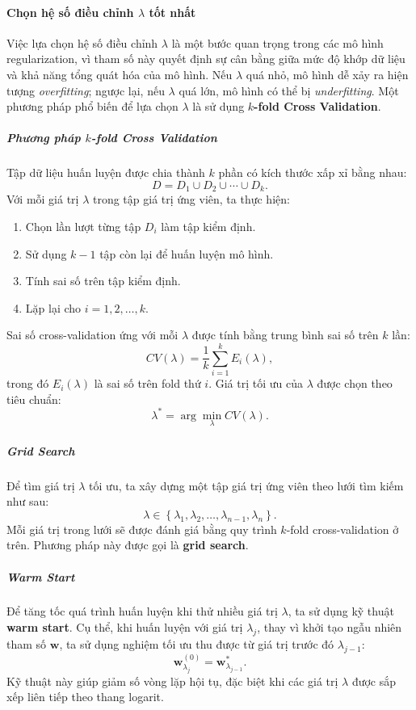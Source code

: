 \paragraph{Chọn hệ số điều chỉnh $\lambda$ tốt nhất}
Việc lựa chọn hệ số điều chỉnh $\lambda$ là một bước quan trọng trong các mô
hình regularization, vì tham số này quyết định sự cân bằng giữa mức độ khớp dữ
liệu và khả năng tổng quát hóa của mô hình. Nếu $\lambda$ quá nhỏ, mô hình dễ
xảy ra hiện tượng \textit{overfitting}; ngược lại, nếu $\lambda$ quá lớn, mô
hình có thể bị \textit{underfitting}. Một phương pháp phổ biến để lựa chọn
$\lambda$ là sử dụng \textbf{$k$-fold Cross Validation}.

\subparagraph{Phương pháp $k$-fold Cross Validation}
Tập dữ liệu huấn luyện được chia thành $k$ phần có kích thước xấp xỉ bằng
nhau:
\begin{equation}
D = D_1 \cup D_2 \cup \cdots \cup D_{k}.
\end{equation}
Với mỗi giá trị $\lambda$ trong tập giá trị ứng viên, ta thực hiện:
\begin{enumerate}
    \item Chọn lần lượt từng tập $D_i$ làm tập kiểm định.
    \item Sử dụng $k-1$ tập còn lại để huấn luyện mô hình.
    \item Tính sai số trên tập kiểm định.
    \item Lặp lại cho $i = 1,2,\ldots,k$.
\end{enumerate}
Sai số cross-validation ứng với mỗi $\lambda$ được tính bằng trung bình sai số
trên $k$ lần:
\begin{equation}
CV(\lambda) = \frac{1}{k}\sum_{i=1}^{k} E_i(\lambda),
\end{equation}
trong đó $E_i(\lambda)$ là sai số trên fold thứ $i$.
Giá trị tối ưu của $\lambda$ được chọn theo tiêu chuẩn:
\begin{equation}
\lambda^\ast = \arg\min_{\lambda} CV(\lambda).
\end{equation}

\subparagraph{Grid Search}
Để tìm giá trị $\lambda$ tối ưu, ta xây dựng một tập giá trị ứng viên theo
lưới tìm kiếm như sau:
\begin{equation}
\lambda \in \left\{\lambda_1, \lambda_2, \ldots, \lambda_{n-1}, \lambda_{n}
\right\}.
\end{equation}
Mỗi giá trị trong lưới sẽ được đánh giá bằng quy trình $k$-fold
cross-validation ở trên. Phương pháp này được gọi là \textbf{grid search}.

\subparagraph{Warm Start}
Để tăng tốc quá trình huấn luyện khi thử nhiều giá trị $\lambda$, ta sử dụng
kỹ thuật \textbf{warm start}.
Cụ thể, khi huấn luyện với giá trị $\lambda_j$, thay vì khởi tạo ngẫu nhiên
tham số $\boldsymbol{w}$, ta sử dụng nghiệm tối ưu thu được từ giá trị trước đó
$\lambda_{j-1}$:
\begin{equation}
  \boldsymbol{w}^{(0)}_{\lambda_j} = \boldsymbol{w}^\ast_{\lambda_{j-1}}.
\end{equation}
Kỹ thuật này giúp giảm số vòng lặp hội tụ, đặc biệt khi các giá trị $\lambda$
được sắp xếp liên tiếp theo thang logarit.

